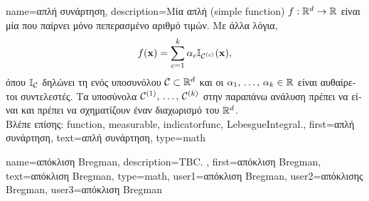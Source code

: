 {name={\foreignlanguage{greek}{απλή συνάρτηση}},
	description={\foreignlanguage{greek}{Μία απλή}  (simple function)
 		$f: \mathbb{R}^{d} \rightarrow \mathbb{R}$ \foreignlanguage{greek}{είναι μία}  
 		 \foreignlanguage{greek}{που παίρνει μόνο πεπερασμένο αριθμό τιμών. Με άλλα λόγια,
 		$$f({\bf x}) = \sum_{c=1}^{k} \alpha_{c} \mathbb{I}_{\mathcal{C}^{(c)}}({\bf x}),$$ 
 		όπου $\mathbb{I}_{\mathcal{C}}$ δηλώνει τη}  \foreignlanguage{greek}{ενός υποσυνόλου 
 		$\mathcal{C} \subset \mathbb{R}^{d}$ και οι $\alpha_{1},\,\ldots,\,\alpha_{k} \in \mathbb{R}$ είναι αυθαίρετοι συντελεστές. 
		Τα υποσύνολα $\mathcal{C}^{(1)},\,\ldots,\,\mathcal{C}^{(k)}$ στην παραπάνω ανάλυση πρέπει να είναι} 
 		 \foreignlanguage{greek}{και πρέπει να σχηματίζουν έναν διαχωρισμό του} $\mathbb{R}^{d}$. 
		\\ 
		\foreignlanguage{greek}{Βλέπε επίσης:} \gls{function}, \gls{measurable}, \gls{indicatorfunc}, \gls{LebesgueIntegral}.}, 
 	first={\foreignlanguage{greek}{απλή συνάρτηση}}, 
 	text={\foreignlanguage{greek}{απλή συνάρτηση}}, 
 	type=math
}

{name={\foreignlanguage{greek}{απόκλιση} Bregman},
	description={TBC. },
	first={\foreignlanguage{greek}{απόκλιση} Bregman},
	text={\foreignlanguage{greek}{απόκλιση} Bregman},
	type=math,
	user1={\foreignlanguage{greek}{απόκλιση} Bregman}, %
  	user2={\foreignlanguage{greek}{απόκλισης} Bregman}, %
	user3={\foreignlanguage{greek}{απόκλιση} Bregman} %
}

